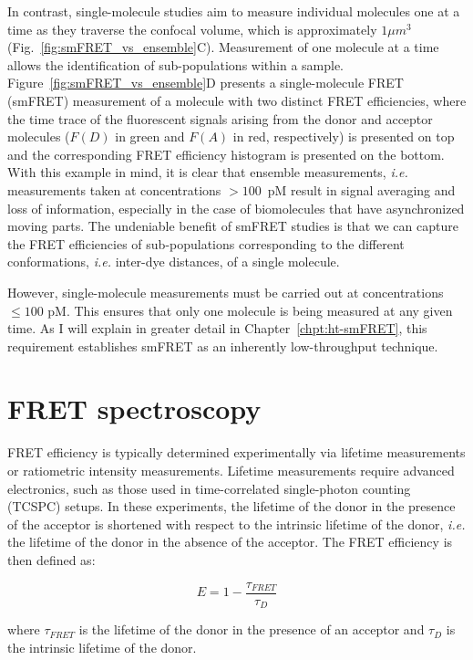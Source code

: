 In contrast, single-molecule studies aim to measure individual molecules one at a time as they traverse the confocal volume, which is approximately $1\mu m^3$ (Fig.~\ref{fig:smFRET_vs_ensemble}C).
Measurement of one molecule at a time allows the identification of sub-populations within a sample. 
Figure~\ref{fig:smFRET_vs_ensemble}D presents a single-molecule FRET (\ac{smFRET}) measurement of a molecule with two distinct FRET efficiencies, where the time trace of the fluorescent signals arising from the donor and acceptor molecules ($F(D)$ in green and $F(A)$ in red, respectively) is presented on top and the corresponding FRET efficiency histogram is presented on the bottom.
With this example in mind, it is clear that ensemble measurements, \textit{i.e.} measurements taken at concentrations $> 100$~pM result in signal averaging and loss of information, especially in the case of biomolecules that have asynchronized moving parts.
The undeniable benefit of \ac{smFRET} studies is that we can capture the FRET efficiencies of sub-populations corresponding to the different conformations, \textit{i.e.} inter-dye distances, of a single molecule.

However, single-molecule measurements must be carried out at concentrations $\leq 100$ pM.
This ensures that only one molecule is being measured at any given time.
As I will explain in greater detail in Chapter~\ref{chpt:ht-smFRET}, this requirement establishes smFRET as an inherently low-throughput technique.

\section{FRET spectroscopy
\label{sec:FRET_intro}}

FRET efficiency is typically determined experimentally via lifetime measurements or ratiometric intensity measurements.
Lifetime measurements require advanced electronics, such as those used in time-correlated single-photon counting (\ac{TCSPC}) setups.
In these experiments, the lifetime of the donor in the presence of the acceptor is shortened with respect to the intrinsic lifetime of the donor, \textit{i.e.} the lifetime of the donor in the absence of the acceptor.
The FRET efficiency is then defined as:

\begin{equation}
    \label{eqn: E_lifetime}
    E = 1 - \frac{\tau_{FRET}}{\tau_D}
\end{equation}

\noindent
where $\tau_{FRET}$ is the lifetime of the donor in the presence of an acceptor and $\tau_D$ is the intrinsic lifetime of the donor.

